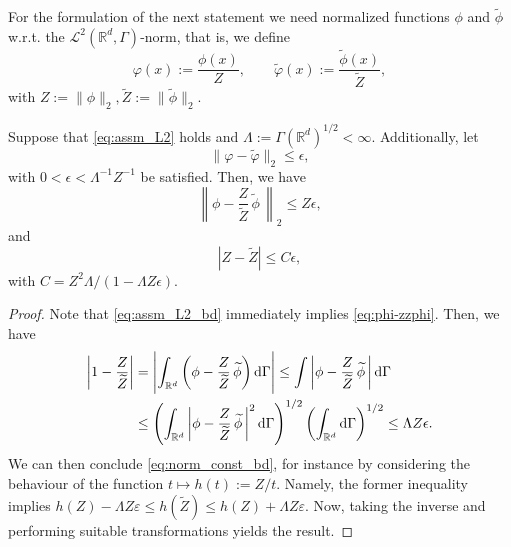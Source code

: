 \documentclass{aptpub}
\newcommand{\Rd}{\mathbb R^d}
\begin{document}
For the formulation of the next statement we need normalized functions $\phi$ and $\widetilde{\phi}$ w.r.t. the $\mathcal L^2(\Rd,\Gamma)$-norm, that is, we define 
\begin{equation*}
    \varphi(x) := \frac{\phi(x)}{Z},\qquad \widetilde \varphi(x) := \frac{\widetilde \phi(x)}{\widetilde Z},
\end{equation*}
with $Z:= \|\phi\|_2, \widetilde Z:= \|\widetilde \phi\|_2$. \begin{lemma}
    Suppose that 
    \eqref{eq:assm_L2} holds and $\Lambda:= \Gamma(\mathbb{R}^d)^{1/2}<\infty$. Additionally, let  
    \begin{equation}
        \|\varphi-\widetilde \varphi\|_2 \le \epsilon,
        \label{eq:assm_L2_bd}
    \end{equation}
    with $0<\epsilon<\Lambda^{-1} Z^{-1}$ be satisfied.
    Then, we have
        \begin{equation}
        \left \| \phi-\frac{Z}{\widetilde Z}\,\widetilde \phi\, \right \|_2 \le Z\epsilon,
        \label{eq:phi-zzphi}
    \end{equation}
    and
    \begin{equation}
        |Z-\widetilde Z|\le C \epsilon,
        \label{eq:norm_const_bd}
    \end{equation}
    with $C=Z^2 \Lambda/(1-\Lambda Z \epsilon)$.
    \label{lemma:norm_const_bd}
\end{lemma}
\begin{proof}
    Note that \eqref{eq:assm_L2_bd} immediately implies \eqref{eq:phi-zzphi}.
    Then, we have
    \begin{align*}
        \left |1-\frac{Z}{\widetilde Z}\right|&=\left | \int_{\mathbb{R}^d} \left(\phi-\frac{Z}{\widetilde Z}\,\widetilde \phi\right)\dif \Gamma \right|
        \le \int \left| \phi - \frac{Z}{\widetilde Z}\,\widetilde \phi  \,\right|\dif \Gamma\\
        &\le \left( \int_{\mathbb{R}^d}\left| \phi - \frac{Z}{\widetilde Z}\,\widetilde \phi  \,\right|^2\dif \Gamma  \right)^{1/2} \left( \int_{\mathbb{R}^d} \dif \Gamma\right)^{1/2}
        \le \Lambda Z \epsilon.
    \end{align*}
    We can then conclude \eqref{eq:norm_const_bd}, for instance by considering the behaviour of the function $t\mapsto h(t):=Z/t$. Namely, the former inequality implies
    $
        h(Z)-\Lambda Z\varepsilon \leq h(\widetilde{Z}) \leq  h(Z)+\Lambda Z\varepsilon.
    $
    Now, taking the inverse and performing suitable transformations yields the result.
\end{proof}
\end{document}
